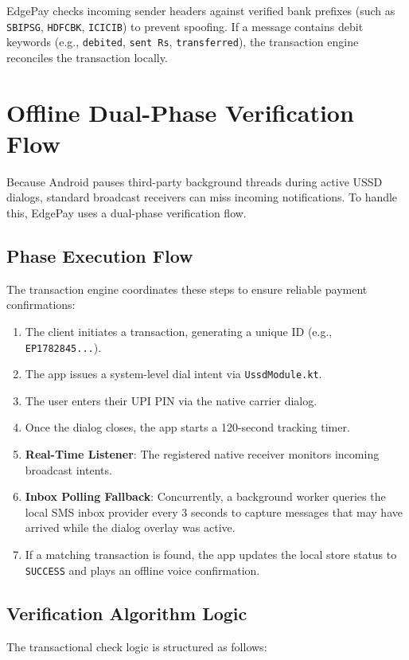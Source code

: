 \documentclass[10pt,journal,compsoc]{IEEEtran}
\begin{document}
EdgePay checks incoming sender headers against verified bank prefixes (such as \texttt{SBIPSG}, \texttt{HDFCBK}, \texttt{ICICIB}) to prevent spoofing. If a message contains debit keywords (e.g., \texttt{debited}, \texttt{sent Rs}, \texttt{transferred}), the transaction engine reconciles the transaction locally.

\section{Offline Dual-Phase Verification Flow}
Because Android pauses third-party background threads during active USSD dialogs, standard broadcast receivers can miss incoming notifications. To handle this, EdgePay uses a dual-phase verification flow.

\subsection{Phase Execution Flow}
The transaction engine coordinates these steps to ensure reliable payment confirmations:
\begin{enumerate}
    \item The client initiates a transaction, generating a unique ID (e.g., \texttt{EP1782845...}).
    \item The app issues a system-level dial intent via \texttt{UssdModule.kt}.
    \item The user enters their UPI PIN via the native carrier dialog.
    \item Once the dialog closes, the app starts a 120-second tracking timer.
    \item \textbf{Real-Time Listener}: The registered native receiver monitors incoming broadcast intents.
    \item \textbf{Inbox Polling Fallback}: Concurrently, a background worker queries the local SMS inbox provider every 3 seconds to capture messages that may have arrived while the dialog overlay was active.
    \item If a matching transaction is found, the app updates the local store status to \texttt{SUCCESS} and plays an offline voice confirmation.
\end{enumerate}

\subsection{Verification Algorithm Logic}
The transactional check logic is structured as follows:
\end{document}
